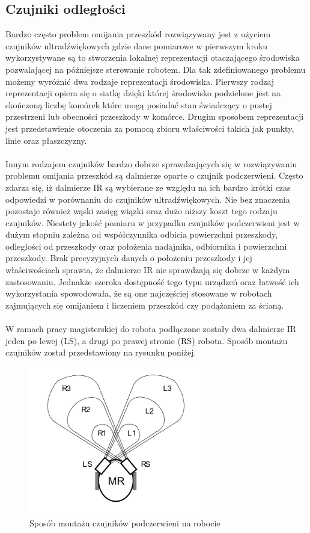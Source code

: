 \subsection{Czujniki odległości}
Bardzo często problem omijania przeszkód rozwiązywany jest z użyciem czujników
ultradźwiękowych gdzie dane pomiarowe w pierwszym kroku wykorzystywane są to
stworzenia lokalnej reprezentacji otaczającego środowiska pozwalającej na
późniejsze sterowanie robotem\cite{ObstaclesAvoidanceIR}. Dla tak zdefiniowanego
problemu możemy wyróżnić dwa rodzaje reprezentacji środowiska. Pierwszy rodzaj
reprezentacji opiera się o siatkę dzięki której środowisko podzielone jest na
skończoną liczbę komórek które mogą posiadać stan świadczący o pustej
przestrzeni lub obecności przeszkody w komórce. Drugim sposobem reprezentacji
jest przedstawienie otoczenia za pomocą zbioru właściwości takich jak punkty,
linie oraz płaszczyzny. \\
\\
Innym rodzajem czujników bardzo dobrze sprawdzających się w rozwiązywaniu
problemu omijania przeszkód są dalmierze oparte o czujnik podczerwieni. Często
zdarza się, iż dalmierze IR są wybierane ze względu na ich bardzo krótki czas
odpowiedzi w porównaniu do czujników ultradźwiękowych. Nie bez znaczenia
pozostaje również wąski zasięg wiązki oraz dużo niższy koszt tego rodzaju
czujników. Niestety jakość pomiaru w przypadku czujników podczerwieni jest w
dużym stopniu zależna od współczynnika odbicia powierzchni przeszkody, 
odległości od przeszkody oraz położenia nadajnika, odbiornika i powierzchni
przeszkody. Brak precyzyjnych danych o położeniu przeszkody i jej
właściwościach sprawia, że dalmierze IR nie sprawdzają się dobrze w każdym
zastosowaniu. Jednakże szeroka dostępność tego typu urządzeń oraz łatwość ich
wykorzystania spowodowała, że są one najczęściej stosowane w robotach
zajmujących się omijaniem i liczeniem przeszkód czy podążaniem za ścianą.\\
\\
W ramach pracy magisterskiej do robota podłączone zostały dwa dalmierze IR jeden
po lewej (LS), a drugi po prawej stronie (RS) robota. Sposób montażu czujników
został przedstawiony na rysunku poniżej. 

\begin{figure}[hb]
 \centering
 \includegraphics[height=65mm]{../images/ch04/ir_sensor_position.png}
 \caption{Sposób montażu czujników podczerwieni na robocie}
 \label{fig:IRSensorPosition}
\end{figure}

